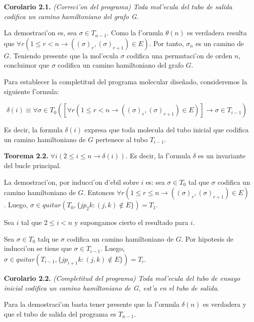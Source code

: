 \documentclass[12pt]{article}
\begin{document}
\textbf{Corolario 2.1.} \textit{(Correci'on del programa) Toda mol'ecula del tubo de salida codifica un camino hamiltoniano
del grafo G}.

La demostraci'on es, sea $\sigma \in T_{n-1}$. Como la f'ormula $\theta(n)$ es verdadera resulta que
$\forall r (1 \leq r < n \longrightarrow ((\sigma)_{r},(\sigma)_{r+1}) \in E)$. Por tanto, $\sigma_{n}$ es un camino de $G$.
Teniendo presente que la mol'ecula $\sigma$ codifica una permutaci'on de orden $n$, concluimor que $\sigma$ codifica
un camino hamiltoniano del grafo $G$.

Para establecer la completitud del programa molecular diseñado, consideremos la siguiente f'ormula:

\begin{equation*}
  \delta(i) \equiv \forall \sigma \in T_{0} ([\forall r (1 \leq r < n \longrightarrow ((\sigma)_{r},(\sigma)_{r+1})
   \in E)] \longrightarrow \sigma \in T_{i-1})
\end{equation*}

Es decir, la formula $\delta(i)$ expresa que toda molecula del tubo inicial que codifica un camino hamiltoniano
de $G$ pertenece al tubo $T_{i-1}$.

\textbf{Teorema 2.2.} $\forall i (2 \leq i \leq n \longrightarrow \delta(i))$. Es decir, la f'ormula $\delta$ es un invariante del
bucle principal.

La demostraci'on, por inducci'on d'ebil sobre $i$ es: sea $\sigma \in T_{0}$ tal que $\sigma$ codifica un camino
hamiltoniano de $G$. Entonces $\forall r (1 \leq r \leq n \longrightarrow ((\sigma)_{r},(\sigma)_{r+1}) \in E)$. Luego,
$\sigma \in quitar(T_{0}, \{jp_{2}k : (j,k) \notin E\}) = T_{1}$.

Sea $i$ tal que $2 \leq i < n$ y supongamos cierto el resultado para $i$.

Sea $\sigma \in T_{0}$ talq ue $\sigma$ codifica un camino hamiltoniano de $G$. Por hipotesis de inducci'on se tiene que
$\sigma \in T_{i-1}$. Luego, $\sigma \in quitar(T_{i-1},\{jp_{i+1}k : (j,k) \notin E\}) = T_{i}$.

\textbf{Corolario 2.2.} \textit{(Completitud del programa) Toda mol'ecula del tubo de ensayo inicial codifica un camino
 hamiltoniano de G, est'a en el tubo de salida}.

Para la demostraci'on basta tener presente que la f'ormula $\delta(n)$ es verdadera y que el tubo de salida del
programa es $T_{n-1}$.

\printbibliography
\end{document}
